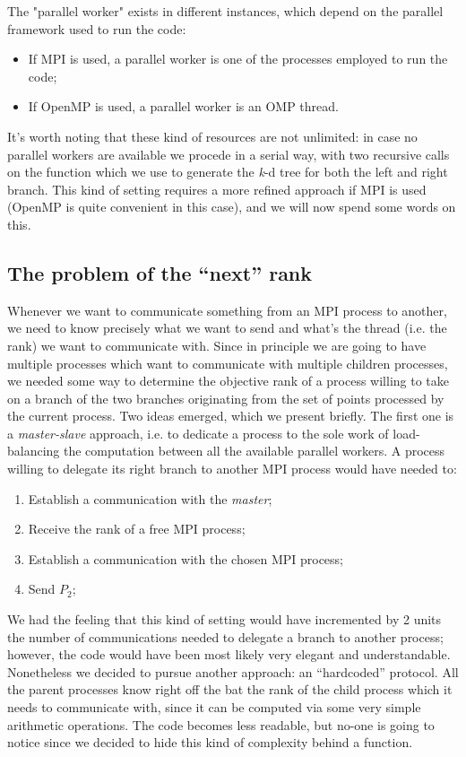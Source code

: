 \documentclass{article}
\newcommand{\kdtree}{\emph{k}-d tree}
\begin{document}
The "parallel worker" exists in different instances, which depend on the
parallel framework used to run the code:
\begin{itemize}
    \item If MPI is used, a parallel worker is one of the processes employed to run the code;
    \item If OpenMP is used, a parallel worker is an OMP thread.
\end{itemize}

It's worth noting that these kind of resources are not unlimited: in case no
parallel workers are available we procede in a serial way, with two recursive
calls on the function which we use to generate the \kdtree{} for both the left
and right branch. This kind of setting requires a more refined approach if
MPI is used (OpenMP is quite convenient in this case), and we will now spend
some words on this.

\subsection{The problem of the ``next'' rank}
Whenever we want to communicate something from an MPI process to another, we
need to know precisely what we want to send and what's the thread
(i.e. the rank) we want to communicate with. Since in principle we are going to
have multiple processes which want to communicate with multiple children
processes, we needed some way to determine the objective rank of a process
willing to take on a branch of the two branches originating from the set of
points processed by the current process. Two ideas emerged, which we present
briefly. The first one is a \emph{master-slave}  approach, i.e. to dedicate a
process to the sole work of load-balancing the computation between all the
available parallel workers. A process willing to delegate its right branch to
another MPI process would have needed to:
\begin{enumerate}
    \item Establish a communication with the \emph{master};
    \item Receive the rank of a free MPI process;
    \item Establish a communication with the chosen MPI process;
    \item Send $P_2$;
\end{enumerate}

We had the feeling that this kind of setting would have incremented by 2 units
the number of communications needed to delegate a branch to another process;
however, the code would have been most likely very elegant and understandable.
Nonetheless we decided to pursue another approach: an ``hardcoded'' protocol.
All the parent processes know right off the bat the rank of the
child process which it needs to communicate with, since it can be computed via
some very simple arithmetic operations. The code becomes less readable, but
no-one is going to notice since we decided to hide this kind of complexity
behind a function.
\end{document}
